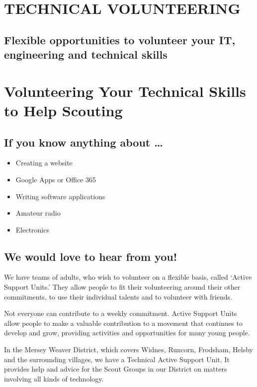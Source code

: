 \documentclass[12pt,foldmark]{leaflet}
\begin{document}
\withrotationtrue
\section{TECHNICAL VOLUNTEERING}
\vspace{2cm}
\subsection{Flexible opportunities to volunteer your IT, engineering and technical skills}
\withrotationfalse
\newpage

\withrotationtrue
\section{Volunteering Your Technical Skills to Help Scouting}
\withrotationfalse
\subsection{If you know anything about \ldots}
\vspace{1cm}
\begin{itemize}
    \item Creating a website
    \item Google Apps or Office 365
    \item Writing software applications
    \item Amateur radio
    \item Electronics
\end{itemize}
\vspace{1cm}
\subsection{We would love to hear from you!}
\newpage

We have teams of adults, who wish to volunteer on a flexible basis, called `Active Support Units.' They allow people to fit their volunteering around their other commitments, to use their individual talents and to volunteer with friends.

Not everyone can contribute to a weekly commitment. Active Support Units allow people to make a valuable contribution to a movement that continues to develop and grow, providing activities and opportunities for many young people.

In the Mersey Weaver District, which covers Widnes, Runcorn, Frodsham, Helsby and the surrounding villages, we have a Technical Active Support Unit. It provides help and advice for the Scout Groups in our District on matters involving all kinds of technology.
\end{document}
